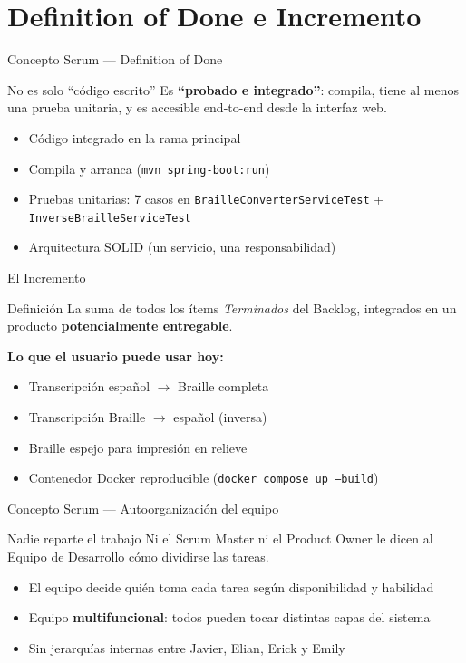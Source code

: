 \documentclass[11pt,aspectratio=169]{beamer}
\begin{document}
\section{Definition of Done e Incremento}

\begin{frame}{Concepto Scrum --- Definition of Done}
  \begin{alertblock}{No es solo ``código escrito''}
    Es \textbf{``probado e integrado''}: compila, tiene al menos una prueba unitaria, y es accesible
    end-to-end desde la interfaz web.
  \end{alertblock}
  \begin{itemize}
    \item[\checkmark] Código integrado en la rama principal
    \item[\checkmark] Compila y arranca (\texttt{mvn spring-boot:run})
    \item[\checkmark] Pruebas unitarias: 7 casos en \texttt{BrailleConverterServiceTest} + \texttt{InverseBrailleServiceTest}
    \item[\checkmark] Arquitectura SOLID (un servicio, una responsabilidad)
  \end{itemize}
\end{frame}

\begin{frame}{El Incremento}
  \begin{block}{Definición}
    La suma de todos los ítems \emph{Terminados} del Backlog, integrados en un producto
    \textbf{potencialmente entregable}.
  \end{block}
  \textbf{Lo que el usuario puede usar hoy:}
  \begin{itemize}
    \item Transcripción español $\rightarrow$ Braille completa
    \item Transcripción Braille $\rightarrow$ español (inversa)
    \item Braille espejo para impresión en relieve
    \item Contenedor Docker reproducible (\texttt{docker compose up --build})
  \end{itemize}
\end{frame}

\begin{frame}{Concepto Scrum --- Autoorganización del equipo}
  \begin{block}{Nadie reparte el trabajo}
    Ni el Scrum Master ni el Product Owner le dicen al Equipo de Desarrollo cómo dividirse las
    tareas.
  \end{block}
  \begin{itemize}
    \item El equipo decide quién toma cada tarea según disponibilidad y habilidad
    \item Equipo \textbf{multifuncional}: todos pueden tocar distintas capas del sistema
    \item Sin jerarquías internas entre Javier, Elian, Erick y Emily
  \end{itemize}
\end{frame}
\end{document}
